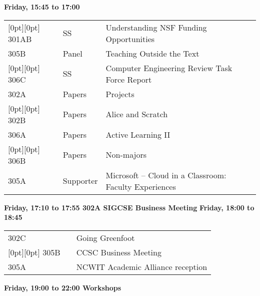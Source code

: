 \noindent
{\sffamily\bfseries Friday, 15:45 to 17:00}\newline\noindent
\begin{tabular*}{5in}{@{}p{0.5in}@{}p{0.75in}@{}p{3.75in}}

\rowcolor[gray]{0.9}[0pt][0pt] 301AB & SS & Understanding NSF Funding Opportunities \\

305B & Panel & Teaching Outside the Text \\

\rowcolor[gray]{0.9}[0pt][0pt] 306C & SS & Computer Engineering Review Task Force Report \\

302A & Papers & Projects \\

\rowcolor[gray]{0.9}[0pt][0pt] 302B & Papers & Alice and Scratch \\

306A & Papers & Active Learning II \\

\rowcolor[gray]{0.9}[0pt][0pt] 306B & Papers & Non-majors \\

305A & Supporter & Microsoft --  Cloud in a Classroom:  Faculty Experiences 
\end{tabular*}
\noindent
{\sffamily\bfseries Friday, 17:10 to 17:55 302A SIGCSE Business Meeting}\newline\noindent
\noindent
{\sffamily\bfseries Friday, 18:00 to 18:45 }\newline\noindent
\begin{tabular*}{5in}{@{}p{0.5in}@{}p{0.75in}@{}p{3.75in}}

302C &  & Going Greenfoot \\
\rowcolor[gray]{0.9}[0pt][0pt] 305B &  & CCSC Business Meeting \\
305A &  & NCWIT Academic Alliance reception \\
\end{tabular*}
\noindent
{\sffamily\bfseries Friday, 19:00 to 22:00 Workshops}\newline\noindent

